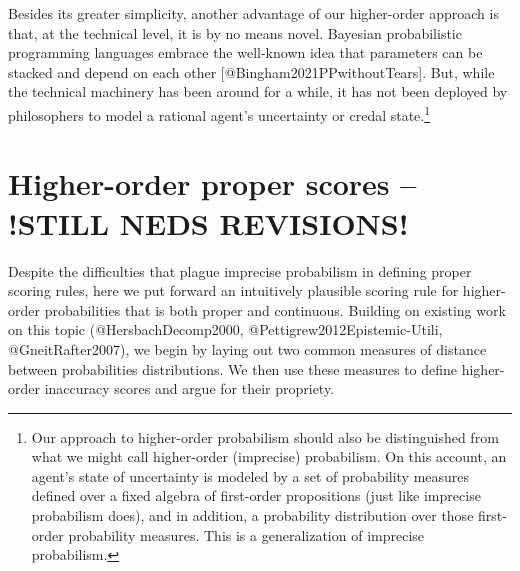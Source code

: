 \documentclass[
  letterpaper,
  DIV=11,
  numbers=noendperiod]{scrartcl}
\begin{document}
Besides its greater simplicity, another advantage of our higher-order
approach is that, at the technical level, it is by no means novel.
Bayesian probabilistic programming languages embrace the well-known idea
that parameters can be stacked and depend on each other
{[}@Bingham2021PPwithoutTears{]}. But, while the technical machinery has
been around for a while, it has not been deployed by philosophers to
model a rational agent's uncertainty or credal state.\footnote{Our
  approach to higher-order probabilism should also be distinguished from
  what we might call higher-order (imprecise) probabilism. On this
  account, an agent's state of uncertainty is modeled by a set of
  probability measures defined over a fixed algebra of first-order
  propositions (just like imprecise probabilism does), and in addition,
  a probability distribution over those first-order probability
  measures. This is a generalization of imprecise probabilism.}

\section{Higher-order proper scores -- !STILL NEDS
REVISIONS!}\label{higher-order-proper-scores-still-neds-revisions}

\label{sec:proper-scores}

Despite the difficulties that plague imprecise probabilism in defining
proper scoring rules, here we put forward an intuitively plausible
scoring rule for higher-order probabilities that is both proper and
continuous. Building on existing work on this topic
(@HersbachDecomp2000, @Pettigrew2012Epistemic-Utili, @GneitRafter2007),
we begin by laying out two common measures of distance between
probabilities distributions. We then use these measures to define
higher-order inaccuracy scores and argue for their propriety.
\end{document}
